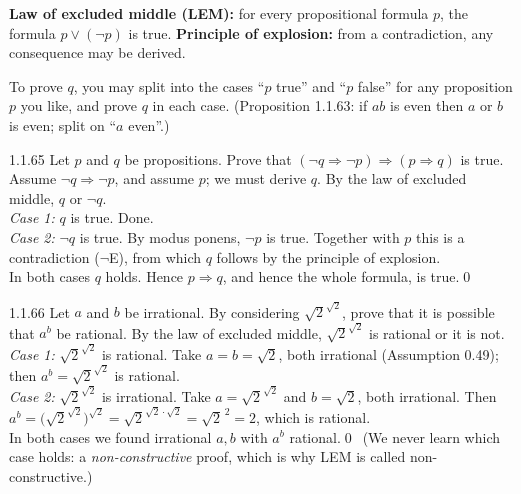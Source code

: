 \begin{result}
\textbf{Law of excluded middle (LEM):} for every propositional formula $p$, the formula $p\vee(\neg p)$ is true. \textbf{Principle of explosion:} from a contradiction, any consequence may be derived.
\end{result}
\begin{strategy}
To prove $q$, you may split into the cases ``$p$ true'' and ``$p$ false'' for any proposition $p$ you like, and prove $q$ in each case. (Proposition 1.1.63: if $ab$ is even then $a$ or $b$ is even; split on ``$a$ even''.)
\end{strategy}

\begin{bookex}[recommended]{1.1.65}
Let $p$ and $q$ be propositions. Prove that $(\neg q\Rightarrow\neg p)\Rightarrow(p\Rightarrow q)$ is true.
\solution
Assume $\neg q\Rightarrow\neg p$, and assume $p$; we must derive $q$. By the law of excluded middle, $q$ or $\neg q$.\\
\emph{Case 1:} $q$ is true. Done.\\
\emph{Case 2:} $\neg q$ is true. By modus ponens, $\neg p$ is true. Together with $p$ this is a contradiction ($\neg$E), from which $q$ follows by the principle of explosion.\\
In both cases $q$ holds. Hence $p\Rightarrow q$, and hence the whole formula, is true.\qed
\end{bookex}

\begin{bookex}[recommended]{1.1.66}
Let $a$ and $b$ be irrational. By considering $\sqrt2^{\sqrt2}$, prove that it is possible that $a^b$ be rational.
\solution
By the law of excluded middle, $\sqrt2^{\sqrt2}$ is rational or it is not.\\
\emph{Case 1:} $\sqrt2^{\sqrt2}$ is rational. Take $a=b=\sqrt2$, both irrational (Assumption 0.49); then $a^b=\sqrt2^{\sqrt2}$ is rational.\\
\emph{Case 2:} $\sqrt2^{\sqrt2}$ is irrational. Take $a=\sqrt2^{\sqrt2}$ and $b=\sqrt2$, both irrational. Then $a^b=\big(\sqrt2^{\sqrt2}\big)^{\sqrt2}=\sqrt2^{\sqrt2\cdot\sqrt2}=\sqrt2^{\,2}=2$, which is rational.\\
In both cases we found irrational $a,b$ with $a^b$ rational.\qed\ (We never learn which case holds: a \emph{non-constructive} proof, which is why LEM is called non-constructive.)
\end{bookex}

